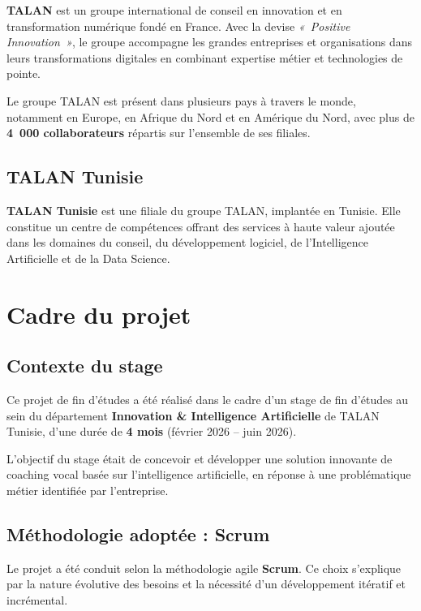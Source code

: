 \documentclass[12pt,a4paper]{report}
\begin{document}
\textbf{TALAN} est un groupe international de conseil en innovation et en transformation numérique fondé en France. Avec la devise \textit{«~Positive Innovation~»}, le groupe accompagne les grandes entreprises et organisations dans leurs transformations digitales en combinant expertise métier et technologies de pointe.

Le groupe TALAN est présent dans plusieurs pays à travers le monde, notamment en Europe, en Afrique du Nord et en Amérique du Nord, avec plus de \textbf{4~000 collaborateurs} répartis sur l'ensemble de ses filiales.

\subsection{TALAN Tunisie}

\textbf{TALAN Tunisie} est une filiale du groupe TALAN, implantée en Tunisie. Elle constitue un centre de compétences offrant des services à haute valeur ajoutée dans les domaines du conseil, du développement logiciel, de l'Intelligence Artificielle et de la Data Science.

\section{Cadre du projet}

\subsection{Contexte du stage}

Ce projet de fin d'études a été réalisé dans le cadre d'un stage de fin d'études au sein du département \textbf{Innovation \& Intelligence Artificielle} de TALAN Tunisie, d'une durée de \textbf{4 mois} (février 2026 -- juin 2026).

L'objectif du stage était de concevoir et développer une solution innovante de coaching vocal basée sur l'intelligence artificielle, en réponse à une problématique métier identifiée par l'entreprise.

\subsection{Méthodologie adoptée : Scrum}

Le projet a été conduit selon la méthodologie agile \textbf{Scrum}. Ce choix s'explique par la nature évolutive des besoins et la nécessité d'un développement itératif et incrémental.
\end{document}
